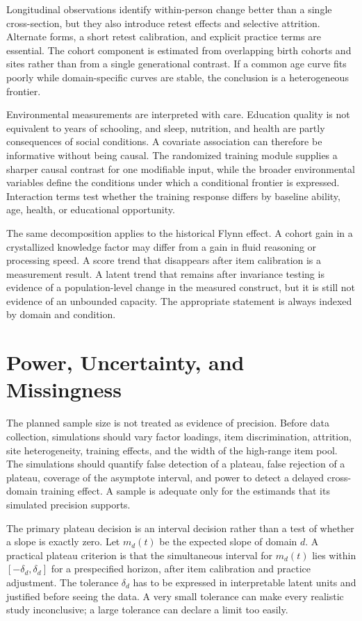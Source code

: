 \documentclass[conference]{IEEEtran}
\begin{document}
Longitudinal observations identify within-person change better than a single cross-section, but they also introduce retest effects and selective attrition. Alternate forms, a short retest calibration, and explicit practice terms are essential. The cohort component is estimated from overlapping birth cohorts and sites rather than from a single generational contrast. If a common age curve fits poorly while domain-specific curves are stable, the conclusion is a heterogeneous frontier.

Environmental measurements are interpreted with care. Education quality is not equivalent to years of schooling, and sleep, nutrition, and health are partly consequences of social conditions. A covariate association can therefore be informative without being causal. The randomized training module supplies a sharper causal contrast for one modifiable input, while the broader environmental variables define the conditions under which a conditional frontier is expressed. Interaction terms test whether the training response differs by baseline ability, age, health, or educational opportunity.

The same decomposition applies to the historical Flynn effect. A cohort gain in a crystallized knowledge factor may differ from a gain in fluid reasoning or processing speed. A score trend that disappears after item calibration is a measurement result. A latent trend that remains after invariance testing is evidence of a population-level change in the measured construct, but it is still not evidence of an unbounded capacity. The appropriate statement is always indexed by domain and condition.

\section{Power, Uncertainty, and Missingness}
\label{sec:power}
The planned sample size is not treated as evidence of precision. Before data collection, simulations should vary factor loadings, item discrimination, attrition, site heterogeneity, training effects, and the width of the high-range item pool. The simulations should quantify false detection of a plateau, false rejection of a plateau, coverage of the asymptote interval, and power to detect a delayed cross-domain training effect. A sample is adequate only for the estimands that its simulated precision supports.

The primary plateau decision is an interval decision rather than a test of whether a slope is exactly zero. Let $m_d(t)$ be the expected slope of domain $d$. A practical plateau criterion is that the simultaneous interval for $m_d(t)$ lies within $[-\delta_d,\delta_d]$ for a prespecified horizon, after item calibration and practice adjustment. The tolerance $\delta_d$ has to be expressed in interpretable latent units and justified before seeing the data. A very small tolerance can make every realistic study inconclusive; a large tolerance can declare a limit too easily.
\end{document}
